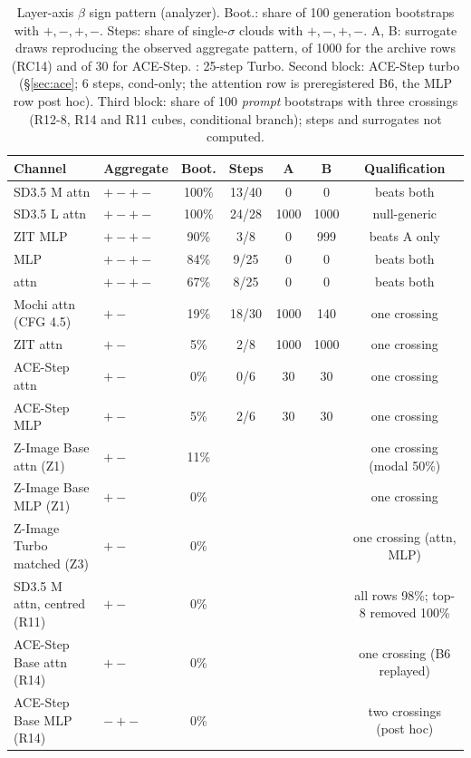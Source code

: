 \begin{table}[htbp]
\centering\small
\caption{Layer-axis $\beta$ sign pattern (analyzer). Boot.: share of 100 generation bootstraps with $+,-,+,-$. Steps: share of single-$\sigma$ clouds with $+,-,+,-$. A, B: surrogate draws reproducing the observed aggregate pattern, of 1000 for the archive rows (RC14) and of 30 for ACE-Step. \TT{}: 25-step Turbo. Second block: ACE-Step turbo (\S\ref{sec:ace}; 6 steps, cond-only; the attention row is preregistered B6, the MLP row post hoc). Third block: share of 100 \emph{prompt} bootstraps with three crossings (R12-8, R14 and R11 cubes, conditional branch); steps and surrogates not computed.}
\label{tab:beta}
\setlength\tabcolsep{4pt}\begin{tabular}{llccccc}
\toprule
Channel & Aggregate & Boot. & Steps & A & B & Qualification\\
\midrule
SD3.5 M attn & $+-+-$ & 100\% & 13/40 & 0 & 0 & beats both\\
SD3.5 L attn & $+-+-$ & 100\% & 24/28 & 1000 & 1000 & null-generic\\
ZIT MLP & $+-+-$ & 90\% & 3/8 & 0 & 999 & beats A only\\
\TT{} MLP & $+-+-$ & 84\% & 9/25 & 0 & 0 & beats both\\
\TT{} attn & $+-+-$ & 67\% & 8/25 & 0 & 0 & beats both\\
Mochi attn (CFG 4.5) & $+-$ & 19\% & 18/30 & 1000 & 140 & one crossing\\
ZIT attn & $+-$ & 5\% & 2/8 & 1000 & 1000 & one crossing\\
\midrule
ACE-Step attn & $+-$ & 0\% & 0/6 & 30 & 30 & one crossing\\
ACE-Step MLP & $+-$ & 5\% & 2/6 & 30 & 30 & one crossing\\
\midrule
Z-Image Base attn (Z1) & $+-$ & 11\% & & & & one crossing (modal 50\%)\\
Z-Image Base MLP (Z1) & $+-$ & 0\% & & & & one crossing\\
Z-Image Turbo matched (Z3) & $+-$ & 0\% & & & & one crossing (attn, MLP)\\
SD3.5 M attn, centred (R11) & $+-$ & 0\% & & & & all rows 98\%; top-8 removed 100\%\\
ACE-Step Base attn (R14) & $+-$ & 0\% & & & & one crossing (B6 replayed)\\
ACE-Step Base MLP (R14) & $-+-$ & 0\% & & & & two crossings (post hoc)\\
\bottomrule
\end{tabular}
\end{table}

